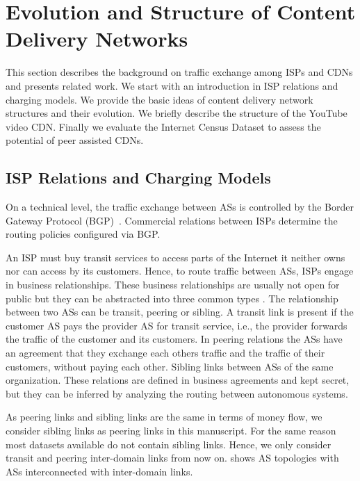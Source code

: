 \section{Evolution and Structure of Content Delivery Networks}\label{sec:aslevel:background}

This section describes the background on traffic exchange among ISPs and CDNs and presents related work.
We start with an introduction in ISP relations and charging models.
We provide the basic ideas of content delivery network structures and their evolution.
We briefly describe the structure of the YouTube video CDN.
Finally we evaluate the Internet Census Dataset to assess the potential of peer assisted CDNs.

\subsection{ISP Relations and Charging Models}

On a technical level, the traffic exchange between ASs is controlled by the Border Gateway Protocol (BGP)~\cite{trangia2009}. Commercial relations between ISPs determine the routing policies configured via BGP.

An ISP must buy transit services to access parts of the Internet it neither owns nor can access by its customers.
Hence, to route traffic between ASs, ISPs engage in business relationships.
These business relationships are usually not open for public but they can be abstracted into three common types \cite{gao2001}.
The relationship between two ASs can be transit, peering or sibling.
A transit link is present if the customer AS pays the provider AS for transit service, i.e., the provider forwards the traffic of the customer and its customers.
In peering relations the ASs have an agreement that they exchange each others traffic and the traffic of their customers, without paying each other.
Sibling links between ASs of the same organization. These relations are defined in business agreements and kept secret, but they can be inferred by analyzing the routing between autonomous systems.

As peering links and sibling links are the same in terms of money flow, we consider sibling links as peering links in this manuscript. For the same reason most datasets available do not contain sibling links.
Hence, we only consider transit and peering inter-domain links from now on.
 shows AS topologies with ASs interconnected with inter-domain links.

